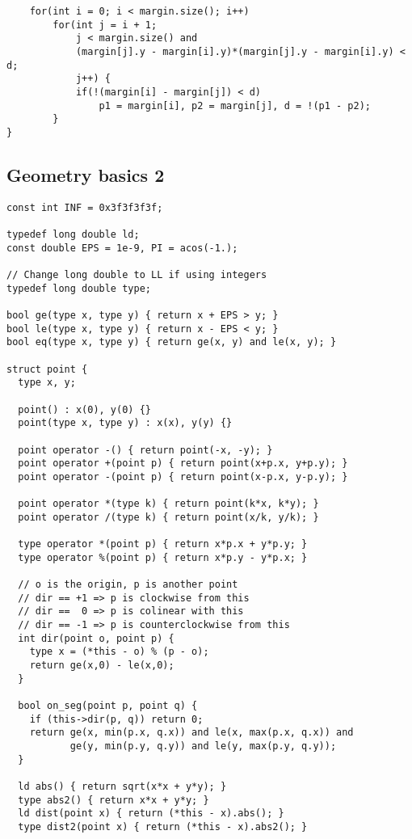 \documentclass[12pt,a4paper,onesided]{article}
\begin{document}
\begin{multicols}{3}
\begin{lstlisting}
    for(int i = 0; i < margin.size(); i++)
        for(int j = i + 1;
            j < margin.size() and
            (margin[j].y - margin[i].y)*(margin[j].y - margin[i].y) < d;
            j++) {
            if(!(margin[i] - margin[j]) < d)
                p1 = margin[i], p2 = margin[j], d = !(p1 - p2);
        }
}
\end{lstlisting}



\subsection{Geometry basics 2}
\begin{lstlisting}
const int INF = 0x3f3f3f3f;

typedef long double ld;
const double EPS = 1e-9, PI = acos(-1.);

// Change long double to LL if using integers
typedef long double type;

bool ge(type x, type y) { return x + EPS > y; }
bool le(type x, type y) { return x - EPS < y; }
bool eq(type x, type y) { return ge(x, y) and le(x, y); }

struct point {
  type x, y;

  point() : x(0), y(0) {}
  point(type x, type y) : x(x), y(y) {}

  point operator -() { return point(-x, -y); }
  point operator +(point p) { return point(x+p.x, y+p.y); }
  point operator -(point p) { return point(x-p.x, y-p.y); }

  point operator *(type k) { return point(k*x, k*y); }
  point operator /(type k) { return point(x/k, y/k); }

  type operator *(point p) { return x*p.x + y*p.y; }
  type operator %(point p) { return x*p.y - y*p.x; }

  // o is the origin, p is another point
  // dir == +1 => p is clockwise from this
  // dir ==  0 => p is colinear with this
  // dir == -1 => p is counterclockwise from this
  int dir(point o, point p) {
    type x = (*this - o) % (p - o);
    return ge(x,0) - le(x,0);
  }

  bool on_seg(point p, point q) {
    if (this->dir(p, q)) return 0;
    return ge(x, min(p.x, q.x)) and le(x, max(p.x, q.x)) and
           ge(y, min(p.y, q.y)) and le(y, max(p.y, q.y));
  }

  ld abs() { return sqrt(x*x + y*y); }
  type abs2() { return x*x + y*y; }
  ld dist(point x) { return (*this - x).abs(); }
  type dist2(point x) { return (*this - x).abs2(); }


\end{lstlisting}
\end{multicols}
\end{document}
